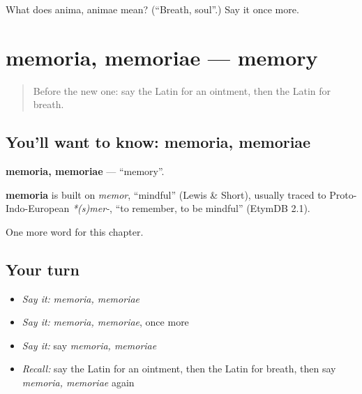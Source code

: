 \begin{tcolorbox}[breakable,colback=teal!4,colframe=teal!35!black,title={Before you move on}]
What does anima, animae mean? (\textquotedblleft{}Breath, soul\textquotedblright{}.) Say it once more.
\end{tcolorbox}
\section[memoria, memoriae]{memoria, memoriae — memory}

\label{lesson:LA-C206-memoria}



\begin{quote}
Before the new one: say the Latin for an ointment, then the Latin for breath.
\end{quote}

\subsection*{You'll want to know: memoria, memoriae}
\textbf{memoria, memoriae} — \textquotedblleft{}memory\textquotedblright{}.

\begin{cousinweb}
\textbf{memoria} is built on \emph{memor}, \textquotedblleft{}mindful\textquotedblright{} (Lewis \& Short), usually traced to Proto-Indo-European \emph{*(s)mer-}, \textquotedblleft{}to remember, to be mindful\textquotedblright{} (EtymDB 2.1).
\end{cousinweb}

\begin{grammarlens}[title={What you've built}]
One more word for this chapter.
\end{grammarlens}

\subsection*{Your turn}
\begin{itemize}
\raggedright
  \item \emph{Say it:} \emph{memoria, memoriae}
  \item \emph{Say it:} \emph{memoria, memoriae}, once more
  \item \emph{Say it:} say \emph{memoria, memoriae}
  \item \emph{Recall:} say the Latin for an ointment, then the Latin for breath, then say \emph{memoria, memoriae} again
\end{itemize}

